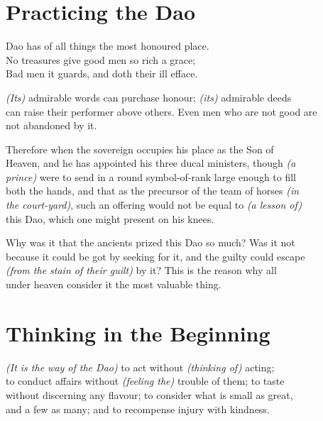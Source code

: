 \section*{Practicing the Dao}
    Dao has of all things the most honoured place.\\
    No treasures give good men so rich a grace;\\
    Bad men it guards, and doth their ill efface.\vspace{\baselineskip}
    
    \textit{(Its)} admirable words can purchase honour;\textit{ (its)} admirable deeds\\
    can raise their performer above others. Even men who are not good are\\
    not abandoned by it.\vspace{\baselineskip}
    
    Therefore when the sovereign occupies his place as the Son of\\
    Heaven, and he has appointed his three ducal ministers, though \textit{(a\\
    prince)} were to send in a round symbol-of-rank large enough to fill\\
    both the hands, and that as the precursor of the team of horses \textit{(in\\
    the court-yard)}, such an offering would not be equal to \textit{(a lesson of)}\\
    this Dao, which one might present on his knees.\vspace{\baselineskip}
    
    Why was it that the ancients prized this Dao so much? Was it not\\
    because it could be got by seeking for it, and the guilty could escape\\
    \textit{(from the stain of their guilt)} by it? This is the reason why all\\
    under heaven consider it the most valuable thing.\vspace{\baselineskip}
    
\section*{Thinking in the Beginning}
    \textit{(It is the way of the Dao)} to act without \textit{(thinking of)} acting;\\
    to conduct affairs without \textit{(feeling the)} trouble of them; to taste\\
    without discerning any flavour; to consider what is small as great,\\
    and a few as many; and to recompense injury with kindness.\vspace{\baselineskip}
    
